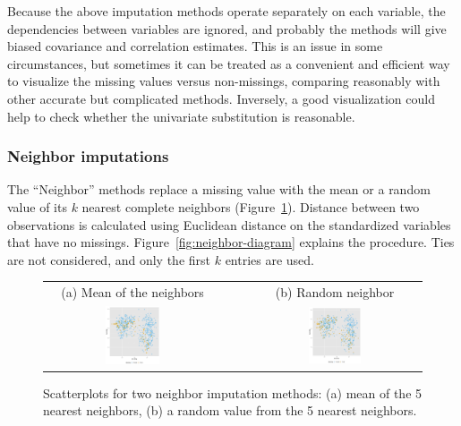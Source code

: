 \documentclass[article]{jss}
\begin{document}
Because the above imputation methods operate separately on each variable, the dependencies between variables are ignored, and probably the methods will give biased covariance and correlation estimates. This is an issue in some circumstances, but sometimes it can be treated as a convenient and efficient way to visualize the missing values versus non-missings, comparing reasonably with other accurate but complicated methods. Inversely, a good visualization could help to check whether the univariate substitution is reasonable.


\subsubsection{Neighbor imputations}


The ``Neighbor'' methods replace a missing value with the mean or a random value of its $k$ nearest complete neighbors (Figure~\ref{fig:neighbor-imputation}). Distance between two observations is calculated using Euclidean distance on the standardized variables that have no missings. Figure~\ref{fig:neighbor-diagram} explains the procedure. Ties are not considered, and only the first $k$ entries are used. 


\begin{center}
\begin{figure}[h]
\begin{centering}
\begin{tabular}{cccc}
{\tiny{(a) Mean of the neighbors}} &  &  & {\tiny{(b) Random neighbor}}\tabularnewline
\includegraphics[width=0.32\textwidth]{graph/fig3-5-knn} &  &  & \includegraphics[width=0.32\textwidth]{graph/fig3-5-knn-2}\tabularnewline
\end{tabular}
\par\end{centering}
\caption{Scatterplots for two neighbor imputation methods: (a) mean of the 5 nearest neighbors, (b) a random value from the 5 nearest neighbors.}
\label{fig:neighbor-imputation}
\end{figure}
\par\end{center}
\end{document}
